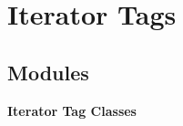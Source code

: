 \section{Iterator Tags}
\label{group__iterator__tags}
\subsection*{Modules}
\begin{CompactItemize}
\item 
{\bf Iterator Tag Classes}
\end{CompactItemize}
